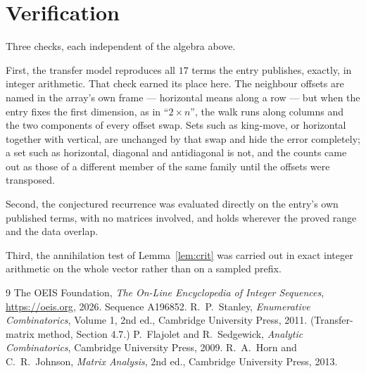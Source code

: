 \documentclass[11pt,a4paper]{article}
\theoremstyle{plain}
\theoremstyle{definition}
\begin{document}
\section{Verification}

Three checks, each independent of the algebra above.

First, the transfer model reproduces all $17$ terms the entry publishes, exactly, in
integer arithmetic. That check earned its place here. The neighbour offsets are named in the
array's own frame --- horizontal means along a row --- but when the entry fixes the first
dimension, as in ``$2\times n$'', the walk runs along columns and the two components of every
offset swap. Sets such as king-move, or horizontal together with vertical, are unchanged by
that swap and hide the error completely; a set such as horizontal, diagonal and antidiagonal
is not, and the counts came out as those of a different member of the same family until the
offsets were transposed.

Second, the conjectured recurrence was evaluated directly on the entry's own published terms,
with no matrices involved, and holds wherever the proved range and the data overlap.

Third, the annihilation test of Lemma~\ref{lem:crit} was carried out in exact integer
arithmetic on the whole vector rather than on a sampled prefix.

\begin{thebibliography}{9}
 The OEIS Foundation, \emph{The On-Line Encyclopedia of Integer
Sequences}, \url{https://oeis.org}, 2026. Sequence A196852.
 R.~P.~Stanley, \emph{Enumerative Combinatorics}, Volume 1, 2nd ed.,
Cambridge University Press, 2011. (Transfer-matrix method, Section 4.7.)
 P.~Flajolet and R.~Sedgewick, \emph{Analytic Combinatorics}, Cambridge
University Press, 2009.
 R.~A.~Horn and C.~R.~Johnson, \emph{Matrix Analysis}, 2nd ed., Cambridge
University Press, 2013.
\end{thebibliography}
\end{document}

